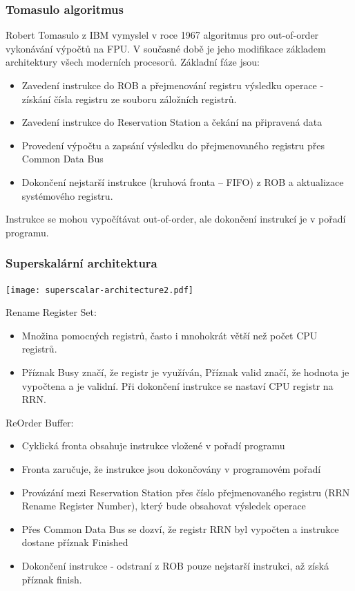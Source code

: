 \documentclass{beamer}
\begin{document}
\begin{frame}
\frametitle{Tomasulo algoritmus}

Robert Tomasulo z IBM vymyslel v roce 1967 algoritmus pro out-of-order vykonávání výpočtů na FPU.
V současné době je jeho modifikace základem architektury všech moderních procesorů.
Základní fáze jsou:
\begin{itemize}
\item Zavedení instrukce do ROB a přejmenování registru výsledku operace - získání čísla registru ze souboru záložních registrů. 
\item Zavedení instrukce do Reservation Station a čekání na připravená data
\item Provedení výpočtu a zapsání výsledku do přejmenovaného registru přes Common Data Bus
\item Dokončení nejstarší instrukce (kruhová fronta -- FIFO) z ROB a aktualizace systémového registru.
\end{itemize}
Instrukce se mohou vypočítávat out-of-order, ale dokončení instrukcí je v pořadí programu.
\end{frame}

\begin{frame}
\frametitle{Superskalární architektura}

\begin{center}
\texttt{[image: superscalar-architecture2.pdf]}
\end{center}

\scriptsize
Rename Register Set:
\begin{itemize}
\item Množina pomocných registrů, často i mnohokrát větší než počet CPU registrů.
\item Příznak Busy značí, že registr je využíván, Příznak valid značí, že hodnota je vypočtena a je validní. Při dokončení instrukce se nastaví CPU registr na RRN.
\end{itemize}

ReOrder Buffer:
\begin{itemize}
\item Cyklická fronta obsahuje instrukce vložené v pořadí programu
\item Fronta zaručuje, že instrukce jsou dokončovány v programovém pořadí
\item Provázání mezi Reservation Station přes číslo přejmenovaného registru (RRN Rename Register Number), který bude obsahovat výsledek operace
\item Přes Common Data Bus se dozví, že registr RRN byl vypočten a instrukce dostane příznak Finished
\item Dokončení instrukce - odstraní z ROB pouze nejstarší instrukci, až získá příznak finish.
\end{itemize}


\end{frame}
\end{document}
